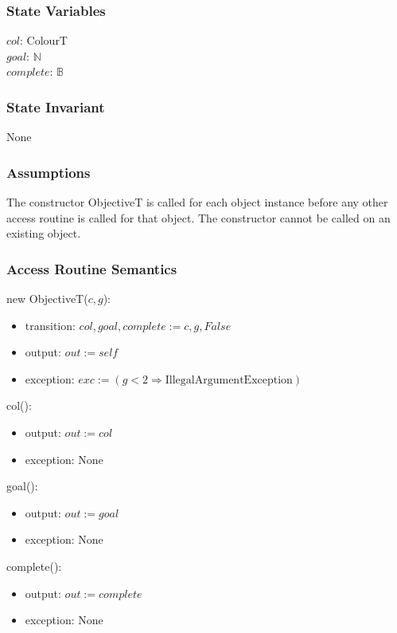 \documentclass[12pt]{article}
\newcommand{\Implies}{\Rightarrow}
\begin{document}
\subsubsection* {State Variables}

$col$: ColourT\\
$goal$: $\mathbb{N}$\\
$complete$: $\mathbb{B}$

\subsubsection* {State Invariant}

None

\subsubsection* {Assumptions}

The constructor ObjectiveT is called for each object instance before any other
access routine is called for that object.  The constructor cannot be called on
an existing object.


\subsubsection* {Access Routine Semantics}

new ObjectiveT($c, g$):
\begin{itemize}
	\item transition: $col, goal, complete := c, g, False$
	\item output: $out := \mathit{self}$
	\item exception: $exc := (g < 2 \Implies \mbox{IllegalArgumentException})$
\end{itemize}

\noindent col():
\begin{itemize}
	\item output: $out := col$
	\item exception: None
\end{itemize}

\noindent goal():
\begin{itemize}
	\item output: $out := goal$
	\item exception: None
\end{itemize}

\noindent complete():
\begin{itemize}
	\item output: $out := complete$
	\item exception: None
\end{itemize}
\end{document}
